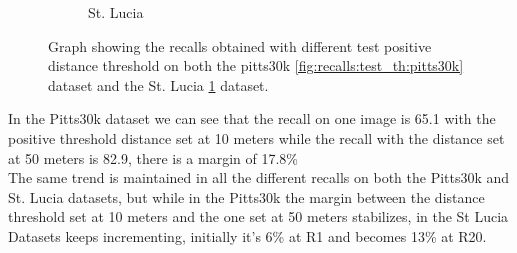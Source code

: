 \documentclass[10pt,twocolumn,letterpaper]{article}
\begin{document}
\begin{figure}
\begin{subfigure}[b]{0.23\textwidth}
		\caption{St. Lucia}
		\label{fig:recalls:test_th:st_lucia}
	\end{subfigure}
	\caption{Graph showing the recalls obtained with different test positive distance threshold on both the pitts30k \ref{fig:recalls:test_th:pitts30k} dataset and the St. Lucia \ref{fig:recalls:test_th:st_lucia} dataset.}
	\label{fig:recalls:test_th}
\end{figure}
In the Pitts30k dataset we can see that the recall on one image is 65.1 with the positive threshold distance set at 10 meters while the recall with the distance set at 50 meters is 82.9, there is a margin of 17.8\%\\
The same trend is maintained in all the different recalls on both the Pitts30k and St. Lucia datasets, but while in the Pitts30k the margin between the distance threshold set at 10 meters and the one set at 50 meters stabilizes, in the St Lucia Datasets keeps incrementing, initially it's 6\% at R1 and becomes 13\% at R20.
\end{document}
